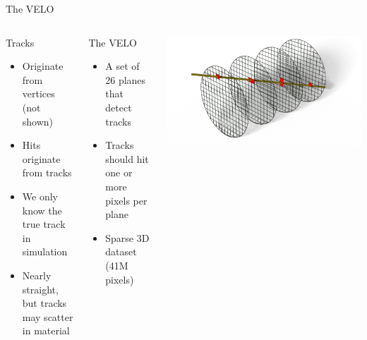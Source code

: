 \begin{frame}{The VELO}
  \begin{columns}[c]
    \begin{block}{Tracks}
      \begin{itemize}
          \item Originate from vertices (not shown)
          \item Hits originate from tracks
          \item We only know the true track in simulation
          \item Nearly straight, but tracks may scatter in material
      \end{itemize}
    \end{block}
    \begin{block}{The VELO}
      \begin{itemize}
          \item A set of 26 planes that detect tracks
          \item Tracks should hit one or more pixels per plane
          \item Sparse 3D dataset (41M pixels)
      \end{itemize}
    \end{block}
    \centering
    \includegraphics[width=\textwidth, trim=200 0 100 0]{images/Intersections.png}
  \end{columns}
\end{frame}
